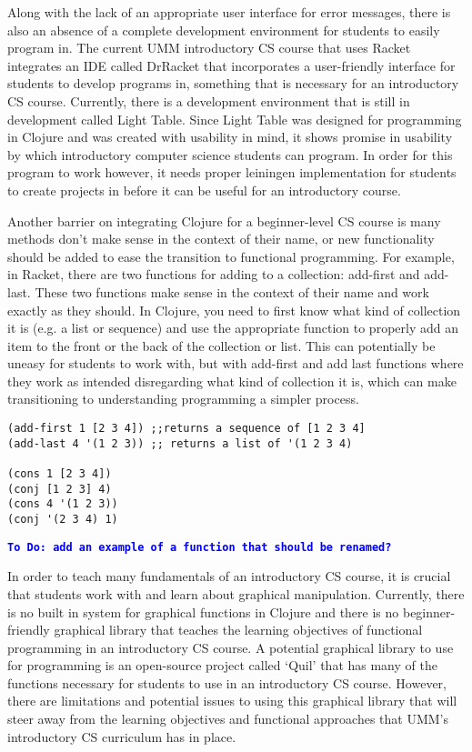 \documentclass[12pt]{article}
\newcommand{\comment}[1]{{\bf \tt  {#1}}}
\newcommand{\todo}[1]{\textcolor{blue}{\comment{To Do: {#1}}}}
\begin{document}
Along with the lack of an appropriate user interface for error messages, there is also an absence of a complete development environment for students to easily program in. The current UMM introductory CS course that uses Racket integrates an IDE called DrRacket that incorporates a user-friendly interface for students to develop programs in, something that is necessary for an introductory CS course.  Currently, there is a development environment that is still in development called Light Table.  Since Light Table was designed for programming in Clojure and was created with usability in mind, it shows promise in usability by which introductory computer science students can program. In order for this program to work however, it needs proper leiningen implementation for students to create projects in before it can be useful for an introductory course.

Another barrier on integrating Clojure for a beginner-level CS course is many methods don’t make sense in the context of their name, or new functionality should be added to ease the transition to functional programming.  For example, in Racket, there are two functions for adding to a collection: add-first and add-last. These two functions make sense in the context of their name and work exactly as they should. In Clojure, you need to first know what kind of collection it is (e.g. a list or sequence) and use the appropriate function to properly add an item to the front or the back of the collection or list. This can potentially be uneasy for students to work with, but with add-first and add last functions where they work as intended disregarding what kind of collection it is, which can make transitioning to understanding programming a simpler process.

\begin{verbatim}         
(add-first 1 [2 3 4]) ;;returns a sequence of [1 2 3 4]
(add-last 4 '(1 2 3)) ;; returns a list of '(1 2 3 4)

(cons 1 [2 3 4])
(conj [1 2 3] 4)
(cons 4 '(1 2 3))
(conj '(2 3 4) 1)
\end{verbatim}

\todo{add an example of a function that should be renamed?}

In order to teach many fundamentals of an introductory CS course, it is crucial that students work with and learn about graphical manipulation. Currently, there is no built in system for graphical functions in Clojure and there is no beginner-friendly graphical library that teaches the learning objectives of functional programming in an introductory CS course. A potential graphical library to use for programming is an open-source project called ‘Quil’ that has many of the functions necessary for students to use in an introductory CS course. However, there are limitations and potential issues to using this graphical library that will steer away from the learning objectives and functional approaches that UMM’s introductory CS curriculum has in place.
\end{document}
